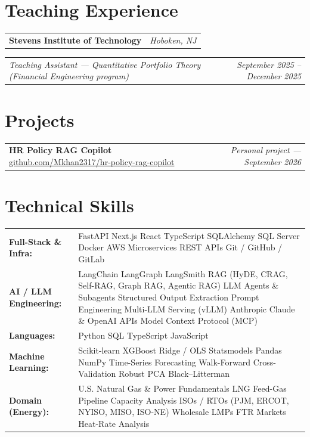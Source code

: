 \documentclass[10pt,letterpaper]{article}
\makeatletter
\newcommand{\entryrow}[2]{%
  \noindent\begin{tabularx}{\linewidth}{@{}X@{}r@{}}%
    #1 & #2 \\
  \end{tabularx}\par\vspace{1pt}%
}
\newcommand{\headline}[4]{%
  \entryrow{\textbf{#1}}{\normalfont\itshape #2}%
  \entryrow{\textit{#3}}{\normalfont\itshape #4}%
}
\makeatother
\begin{document}
\section*{Teaching Experience}
\small
\headline{Stevens Institute of Technology}{Hoboken, NJ}{Teaching Assistant --- Quantitative Portfolio Theory (Financial Engineering program)}{September 2025 -- December 2025}

\section*{Projects}
\small

\entryrow{\textbf{HR Policy RAG Copilot} \; \textperiodcentered\; \href{https://github.com/Mkhan2317/hr-policy-rag-copilot}{github.com/Mkhan2317/hr-policy-rag-copilot}}{\normalfont\itshape Personal project --- September 2026}

\section*{Technical Skills}
\small
\begin{tabularx}{\linewidth}{@{}l X@{}}
  \textbf{Full-Stack \& Infra:} & FastAPI \textperiodcentered{} Next.js \textperiodcentered{} React \textperiodcentered{} TypeScript \textperiodcentered{} SQLAlchemy \textperiodcentered{} SQL Server \textperiodcentered{} Docker \textperiodcentered{} AWS \textperiodcentered{} Microservices \textperiodcentered{} REST APIs \textperiodcentered{} Git / GitHub / GitLab \\[3pt]
  \textbf{AI / LLM Engineering:} & LangChain \textperiodcentered{} LangGraph \textperiodcentered{} LangSmith \textperiodcentered{} RAG (HyDE, CRAG, Self-RAG, Graph RAG, Agentic RAG) \textperiodcentered{} LLM Agents \& Subagents \textperiodcentered{} Structured Output Extraction \textperiodcentered{} Prompt Engineering \textperiodcentered{} Multi-LLM Serving (vLLM) \textperiodcentered{} Anthropic Claude \& OpenAI APIs \textperiodcentered{} Model Context Protocol (MCP) \\[3pt]
  \textbf{Languages:} & Python \textperiodcentered{} SQL \textperiodcentered{} TypeScript \textperiodcentered{} JavaScript \\[3pt]
  \textbf{Machine Learning:} & Scikit-learn \textperiodcentered{} XGBoost \textperiodcentered{} Ridge / OLS \textperiodcentered{} Statsmodels \textperiodcentered{} Pandas \textperiodcentered{} NumPy \textperiodcentered{} Time-Series Forecasting \textperiodcentered{} Walk-Forward Cross-Validation \textperiodcentered{} Robust PCA \textperiodcentered{} Black--Litterman \\[3pt]
  \textbf{Domain (Energy):} & U.S. Natural Gas \& Power Fundamentals \textperiodcentered{} LNG Feed-Gas \textperiodcentered{} Pipeline Capacity Analysis \textperiodcentered{} ISOs / RTOs (PJM, ERCOT, NYISO, MISO, ISO-NE) \textperiodcentered{} Wholesale LMPs \textperiodcentered{} FTR Markets \textperiodcentered{} Heat-Rate Analysis \\
\end{tabularx}
\end{document}
